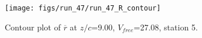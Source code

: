 \begin{figure}[H]
\centering
\texttt{[image: figs/run\_47/run\_47\_R\_contour]}
\caption{Contour plot of $\overline{r}$ at $z/c$=9.00, $V_{free}$=27.08, station 5.}
\end{figure}


